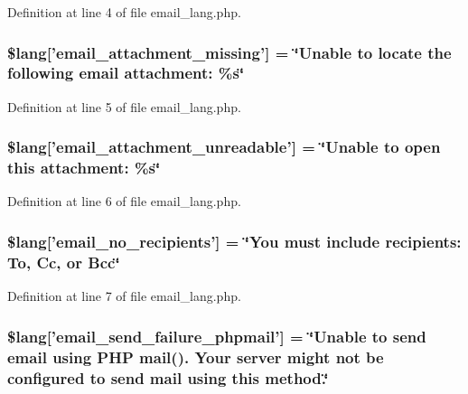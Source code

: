 Definition at line 4 of file email\-\_\-lang.\-php.

\subsubsection[{\$lang}]{\setlength{\rightskip}{0pt plus 5cm}\$lang['email\-\_\-attachment\-\_\-missing'] = \char`\"{}Unable {\bf to} locate the following email attachment\-: \%{\bf s}\char`\"{}}\label{email__lang_8php_a09c0c415b48ef267bf9e36b555be67d9}


Definition at line 5 of file email\-\_\-lang.\-php.

\subsubsection[{\$lang}]{\setlength{\rightskip}{0pt plus 5cm}\$lang['email\-\_\-attachment\-\_\-unreadable'] = \char`\"{}Unable {\bf to} open this attachment\-: \%{\bf s}\char`\"{}}\label{email__lang_8php_acae2e9f7ade1ac9c6b67db0ff752414e}


Definition at line 6 of file email\-\_\-lang.\-php.

\subsubsection[{\$lang}]{\setlength{\rightskip}{0pt plus 5cm}\$lang['email\-\_\-no\-\_\-recipients'] = \char`\"{}You must include recipients\-: To, Cc, {\bf or} Bcc\char`\"{}}\label{email__lang_8php_a8f9d5a049f4dd899d4e61f6d56be5071}


Definition at line 7 of file email\-\_\-lang.\-php.

\subsubsection[{\$lang}]{\setlength{\rightskip}{0pt plus 5cm}\$lang['email\-\_\-send\-\_\-failure\-\_\-phpmail'] = \char`\"{}Unable {\bf to} send email using P\-H\-P mail(). Your server might {\bf not} be configured {\bf to} send mail using this method.\char`\"{}}\label{email__lang_8php_a99a2ce89426340b4c96a245b7874a99d}


